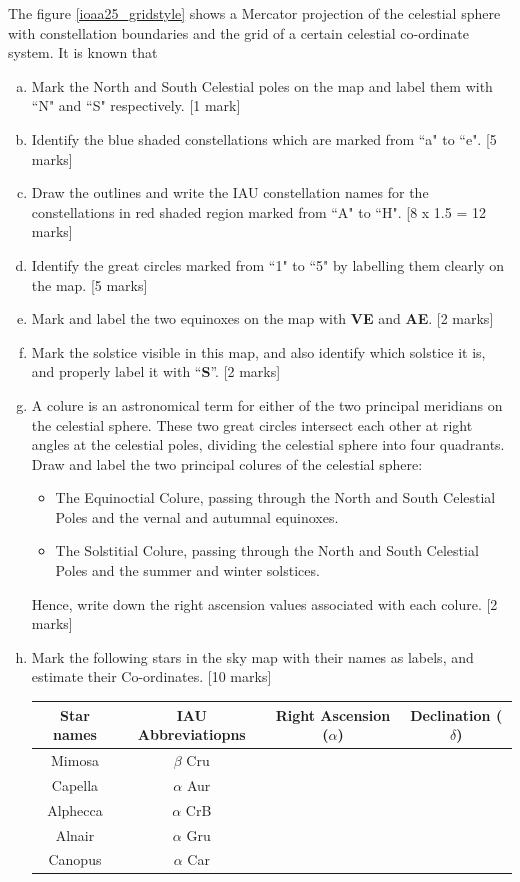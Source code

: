 \documentclass[a4paper,12pt]{extarticle}
\begin{document}
The figure \ref{ioaa25_gridstyle} shows a Mercator projection of the celestial sphere with constellation boundaries and the grid of a certain celestial co-ordinate system. It is known that 


\begin{enumerate}[(a)]
	\item Mark the North and South Celestial poles on the map and label them with ``N" and ``S" respectively. \hfill [1 mark]
	\item Identify the blue shaded constellations which are marked from ``a" to ``e". \hfill [5 marks]
	\item Draw the outlines and write the IAU constellation names for the constellations in red shaded region marked from ``A" to ``H". \hfill [8 x 1.5 = 12 marks]
	\item Identify the great circles marked from ``1" to ``5" by labelling them clearly on the map. \hfill [5 marks]
	\item Mark and label the two equinoxes on the map  with \textbf{VE} and \textbf{AE}. \hfill [2 marks]
	\item Mark the solstice visible in this map, and also identify which solstice it is, and properly label it with ``\textbf{S}''. \hfill[2 marks]
	\item A colure is an astronomical term for either of the two principal meridians on the celestial sphere. These two great circles intersect each other at right angles at the celestial poles, dividing the celestial sphere into four quadrants. Draw and label the two principal colures of the celestial sphere:
	\begin{itemize}
		\item The Equinoctial Colure, passing through the North and South Celestial Poles and the vernal and autumnal equinoxes.
		\item The Solstitial Colure, passing through the North and South Celestial Poles and the summer and winter solstices.
	\end{itemize}
	
	Hence, write down the right ascension values associated with each colure. \hfill[2 marks]
	
	\item Mark the following stars in the sky map with their names as labels, and estimate their Co-ordinates. \hfill[10 marks]
	
	\begin{table}[H]
		\centering
		\begin{tabular}{|c|c|c|c|}
			\hline
			Star names & IAU Abbreviatiopns &Right Ascension ($\alpha$) & Declination ($\delta$) \\ \hline 
			Mimosa & $\beta$ Cru & & \\ \hline
			Capella & $\alpha$ Aur & & \\ \hline
			Alphecca & $\alpha$ CrB & & \\ \hline
			Alnair & $\alpha$ Gru & & \\ \hline
			Canopus & $\alpha$ Car & & \\ \hline
		\end{tabular}
	\end{table}
	

\end{enumerate}
\end{document}
